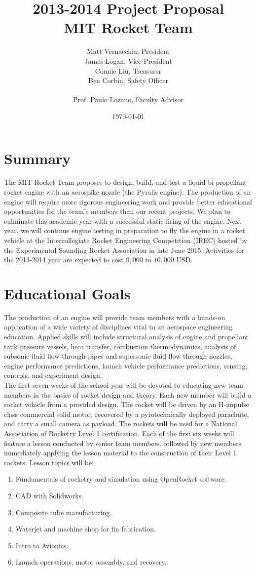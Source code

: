 \documentclass{article}
\title{ 2013-2014 Project Proposal \\ MIT Rocket Team} %
\author{Matt Vernacchia, President\\James Logan, Vice President\\Connie Liu, Treasurer\\Ben Corbin, Safety Officer
\\\\ Prof. Paulo Lozano, Faculty Advisor} %
\date{ \today } %
\begin{document}
\maketitle
\section*{Summary}
The MIT Rocket Team proposes to design, build, and test a liquid bi-propellant rocket engine with an aerospike nozzle (the Pyralis engine).
The production of an engine will require more rigorous engineering work and provide better educational opportunities for the team's members than our recent projects. We plan to culminate this academic year with a successful static firing of the engine. Next year, we will continue engine testing in preparation to fly the engine in a rocket vehicle at the Intercollegiate Rocket Engineering Competition (IREC) hosted by the Experimental Sounding Rocket Association in late June 2015. Activities for the 2013-2014 year are expected to cost $9,000$ to $10,000$ USD.
\section*{Educational Goals}
The production of an engine will provide team members with a hands-on application of a wide variety of disciplines vital to an aerospace engineering education. Applied skills will include structural analysis of engine and propellant tank pressure vessels, heat transfer, combustion thermodynamics, analysis of subsonic fluid flow through pipes and supersonic fluid flow through nozzles, engine performance predictions, launch vehicle performance predictions, sensing, controls, and experiment design.\\

The first seven weeks of the school year will be devoted to educating new team members in the basics of rocket design and theory. Each new member will build a rocket vehicle from a provided design. The rocket will be driven by an H-impulse class commercial solid motor, recovered by a pyrotechnically deployed parachute, and carry a small camera as payload. The rockets will be used for a National Association of Rocketry Level 1 certification. Each of the first six weeks will feature a lesson conducted by senior team members, followed by new members immediately applying the lesson material to the construction of their Level 1 rockets. Lesson topics will be:
\begin{enumerate}
\item Fundamentals of rocketry and simulation using OpenRocket software.
\item CAD with Solidworks.
\item Composite tube manufacturing.
\item Waterjet and machine shop for fin fabrication.
\item Intro to Avionics.
\item Launch operations, motor assembly, and recovery.
\end{enumerate}
\end{document}
